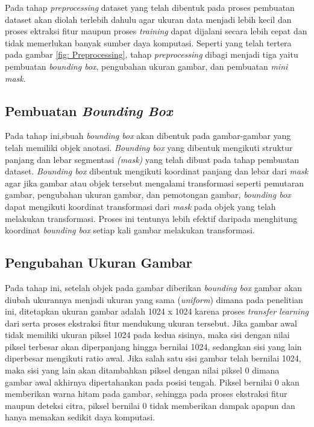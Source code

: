   Pada tahap \textit{preprocessing} dataset yang telah dibentuk pada proses pembuatan dataset akan diolah terlebih 
  dahulu agar ukuran data menjadi lebih kecil dan
  proses ektraksi fitur maupun proses \textit{training} dapat dijalani secara lebih cepat dan tidak memerlukan 
  banyak sumber daya komputasi. Seperti yang telah tertera pada gambar \ref{fig: Preprocessing}, tahap \textit{preprocessing} dibagi menjadi 
  tiga yaitu pembuatan \textit{bounding box}, pengubahan ukuran gambar, dan pembuatan \textit{mini mask}.
  
  \subsection{Pembuatan \textit{Bounding Box}}
  Pada tahap ini,sbuah \textit{bounding box} akan dibentuk pada gambar-gambar yang telah memiliki objek anotasi.
  \textit{Bounding box} yang dibentuk mengikuti struktur panjang dan lebar segmentasi \textit{(mask)} yang telah 
  dibuat pada tahap pembuatan dataset. \textit{Bounding box} dibentuk mengikuti koordinat panjang dan lebar dari
  \textit{mask} agar jika gambar atau objek tersebut mengalami transformasi seperti pemutaran gambar, pengubahan
  ukuran gambar, dan pemotongan gambar, \textit{bounding box} dapat mengikuti koordinat transformasi dari 
  \textit{mask} pada objek yang telah melakukan transformasi. Proses ini tentunya lebih efektif daripada menghitung
  koordinat \textit{bounding box} setiap kali gambar melakukan transformasi.

  \subsection{Pengubahan Ukuran Gambar}
Pada tahap ini, setelah objek pada gambar diberikan \textit{bounding box} gambar akan diubah ukurannya menjadi
ukuran yang sama (\textit{uniform}) dimana pada penelitian ini, ditetapkan ukuran gambar adalah 1024 x 1024 karena
proses \textit{transfer learning} dari serta proses ekstraksi fitur mendukung ukuran tersebut. Jika gambar awal
tidak memiliki ukuran piksel 1024 pada kedua sisinya, maka sisi dengan nilai piksel terbesar akan diperpanjang 
hingga bernilai 1024, sedangkan sisi yang lain diperbesar mengikuti ratio awal. Jika salah satu sisi gambar telah
bernilai 1024, maka sisi yang lain akan ditambahkan piksel dengan nilai piksel 0 dimana gambar awal akhirnya
dipertahankan pada posisi tengah. Piksel bernilai 0 akan memberikan warna hitam pada gambar, sehingga pada proses 
ekstraksi fitur maupun deteksi citra, piksel bernilai 0 tidak memberikan dampak apapun dan hanya memakan sedikit 
daya komputasi.


